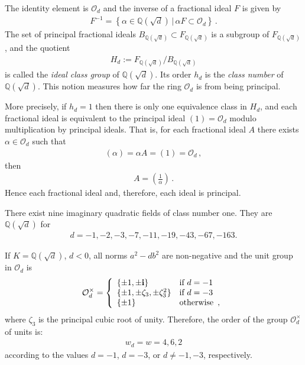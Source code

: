 \documentclass[reqno]{amsart}
\theoremstyle{plain}
\theoremstyle{definition}
\theoremstyle{remark}
\numberwithin{equation}{section}
\begin{document}
The identity element
is ${{\mathcal O}}_d$ and the inverse of a fractional ideal $F$ is given by
\begin{align*}
  F^{-1} = \left\{ \alpha\in{{\mathbb Q}}(\sqrt d)\,\bigg|\, \alpha F\subset {{\mathcal O}}_d\right\}\,.
\end{align*}
The set of principal fractional ideals
$B_{{{\mathbb Q}}(\sqrt d)}\subset F_{{{\mathbb Q}}(\sqrt d)}$ is a subgroup of
$F_{{{\mathbb Q}}(\sqrt d)}$, and the quotient
\begin{align*}
  H_d := F_{{{\mathbb Q}}(\sqrt d)}\big/ B_{{{\mathbb Q}}(\sqrt d)}
\end{align*}
is called the {\em ideal class group} of ${{\mathbb Q}}(\sqrt d)$. Its order
$h_d$ is the {\em class number} of ${{\mathbb Q}}(\sqrt d)$. This notion measures
how far the ring ${{\mathcal O}}_d$ is from being principal.

More precisely, if $h_d=1$ then there is only one
equivalence class in $H_d$, and each fractional ideal is equivalent to
the principal ideal $(1)={{\mathcal O}}_d$ modulo multiplication by principal
ideals. That is, for each fractional ideal $A$ there exists
$\alpha\in{{\mathcal O}}_d$ such that
\begin{align*}
  (\alpha)=\alpha A = (1) = {{\mathcal O}}_d\,,
\end{align*}
then
\begin{align*}
  A = \left( \frac{1}{\alpha}\right)\,.
\end{align*}
Hence each fractional ideal and, therefore, each ideal is principal.

There exist nine imaginary quadratic fields of class number one. They
are ${{\mathbb Q}}(\sqrt d)$ for
\begin{align*}
  d = -1, -2, -3, -7, -11, -19, -43, -67, -163.
\end{align*}

If $K={{\mathbb Q}}(\sqrt d)$, $d<0$, all norms $a^2-db^2$ are non-negative and
the unit group in ${{\mathcal O}}_d$ is
\begin{align*}
  {{\mathcal O}}_d^\times = \left\{
  \begin{array}{ll}
    \{\pm 1,\pm {{\bf i}}\} & \text{if } d=-1\\
    \{\pm 1,\pm \zeta_3,\pm\zeta_3^2\} & \text{if } d=-3\\
    \{\pm 1\} & \text{otherwise }\,,
  \end{array}\right.
\end{align*}
where $\zeta_3$ is the principal cubic root of unity. Therefore, the
order of the group ${{\mathcal O}}_d^\times$ of units is:
\begin{align*}
  w_d = w = 4, 6, 2
\end{align*}
according to the values $d=-1$, $d=-3$, or $d\neq -1,-3$,
respectively.
\end{document}
